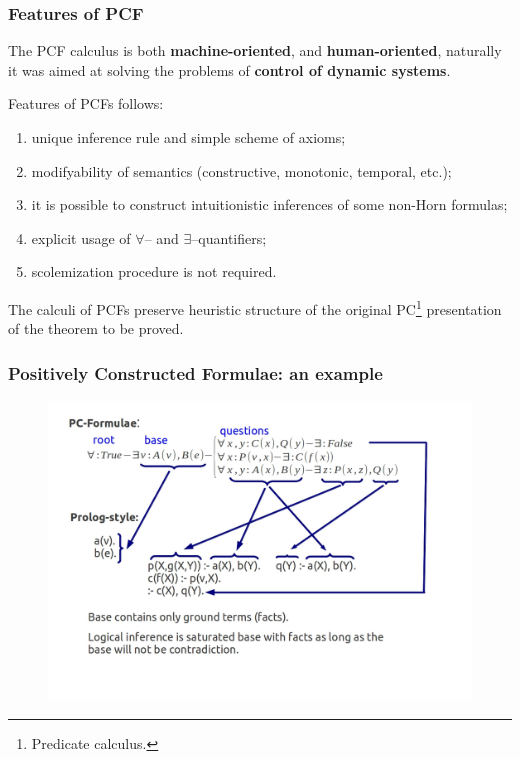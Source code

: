 \documentclass[aspectratio=169]{beamer}
\begin{document}
\begin{frame}
\frametitle{Features of PCF}
The PCF calculus is both \textbf{machine-oriented}, and \textbf{human-oriented}, naturally it was aimed at solving the problems of \textbf{control of dynamic systems}.

Features of PCFs follows:
\begin{enumerate}
\item unique inference rule and simple scheme of axioms;
\item modifyability
  of semantics (constructive, monotonic, temporal, etc.);
\item
  it is possible to construct intuitionistic inferences of some
  non-Horn formulas;
\item explicit usage of $\forall$-- and
  $\exists$--quantifiers;
\item scolemization procedure is not required.

\end{enumerate}
The calculi of PCFs preserve heuristic structure of the original PC\footnote{Predicate calculus.} presentation of the theorem to be proved.
\end{frame}

\begin{frame}

\frametitle{Positively Constructed Formulae: an example}

\begin{figure}
\includegraphics[width=0.8\linewidth]{pics/ex1}
\end{figure}

\end{frame}
\end{document}
